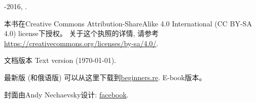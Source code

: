 \documentclass[UTF8,nofonts]{ctexart}
\begin{document}

\begin{titlepage}


\end{titlepage}

\newpage

\begin{center}
\vspace*{\fill}
{\LARGE \TITLE}

\vspace*{\fill}

{\large \AUTHOR}

{\large \TT{<\EMAIL>}}
\vspace*{\fill}
\vfill

\ccbysa

-2016, \AUTHOR. 

本书在Creative Commons Attribution-ShareAlike 4.0 International (CC BY-SA 4.0) license下授权。
关于这个执照的详情, 请参考\url{https://creativecommons.org/licenses/by-sa/4.0/}.

文档版本 Text version ({\large \today}).

最新版 (和俄语版) 可以从这里下载到\href{http://go.yurichev.com/17009}{beginners.re}.
E-book版本。

封面由Andy Nechaevsky设计: \href{http://go.yurichev.com/17023}{facebook}.

\end{center}
\end{document}
